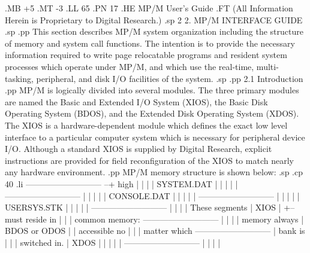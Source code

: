.MB +5
.MT -3
.LL 65
.PN 17
.HE MP/M User's Guide
.FT   (All Information Herein is Proprietary to Digital Research.)
.sp 2
2.  MP/M INTERFACE GUIDE
.sp
.pp
This section describes MP/M system organization including
the structure of memory and system call functions.  The intention
is to provide the necessary information required to write
page relocatable programs and resident system processes
which operate under MP/M, and which use the real-time, multi-tasking,
peripheral, and disk I/O facilities of the system.
.sp
.pp
2.1  Introduction
.pp
MP/M is logically divided into several modules.  The three primary
modules are named the Basic and Extended I/O
System (XIOS), the Basic Disk Operating System
(BDOS), and the Extended Disk Operating System (XDOS).
The XIOS is a hardware-dependent module which defines the
exact low level interface to a particular computer system which
is necessary for peripheral device I/O.  Although a standard
XIOS is supplied by Digital Research, explicit instructions
are provided for field reconfiguration of the XIOS to match
nearly any hardware environment.
.pp
MP/M memory structure is shown below:
.sp
.cp 40
.li
                    --------------------------- --+
              high  |                         |   |
                    |       SYSTEM.DAT        |   |
                    |                         |   |
                    ---------------------------   |
                    |                         |   |
                    |      CONSOLE.DAT        |   |
                    |                         |   |
                    ---------------------------   |
                    |                         |   |
                    |      USERSYS.STK        |   |
                    |                         |   |
                    ---------------------------   |
                    |                         |   |   These segments
                    |          XIOS           |   +-- must reside in
                    |                         |   |   common memory:
                    ---------------------------   |
                    |                         |   |   memory always
                    |      BDOS or ODOS       |   |   accessible no
                    |                         |   |   matter which
                    ---------------------------   |   bank is
                    |                         |   |   switched in.
                    |          XDOS           |   |
                    |                         |   |
                    ---------------------------   |
                    |                         |   |
